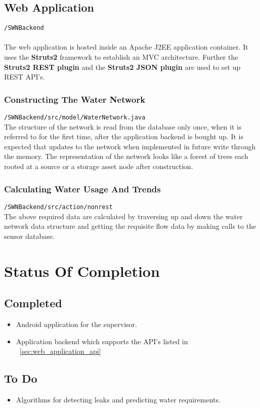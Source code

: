 \documentclass[11pt]{report} %
\begin{document}
\section{Web Application}
\texttt{/SWNBackend} \\
\\
The web application is hosted inside an Apache J2EE application container. It uses the \textbf{ Struts2} framework to establish an MVC architecture. Further the \textbf{Struts2 REST plugin} and the \textbf{Struts2 JSON plugin} are used to set up REST API's.
\\
\noindent

\subsection{Constructing The Water Network}
\texttt{/SWNBackend/src/model/WaterNetwork.java}
\\
\noindent The structure of the network is read from the database only once, when it is referred to for the first time, after the application backend is bought up. It is expected that updates to the network when implemented in future write through the memory.
\noindent The representation of the network looks like a forest of trees each rooted at a source or a storage asset node after construction.

\subsection{Calculating Water Usage And Trends}
\texttt{/SWNBackend/src/action/nonrest}
\\
\noindent The above required data are calculated by traversing up and down the water network data structure and getting the requisite flow data by making calls to the sensor database.

\chapter{Status Of Completion}
\section{Completed}
\begin{itemize}
\item Android application for the supervisor.
\item Application backend which supports the API's listed in ~\ref{sec:web_application_api}
\end{itemize}
\section{To Do}
\begin{itemize}
\item Algorithms for detecting leaks and predicting water requirements.
\end{itemize}
\end{document}
